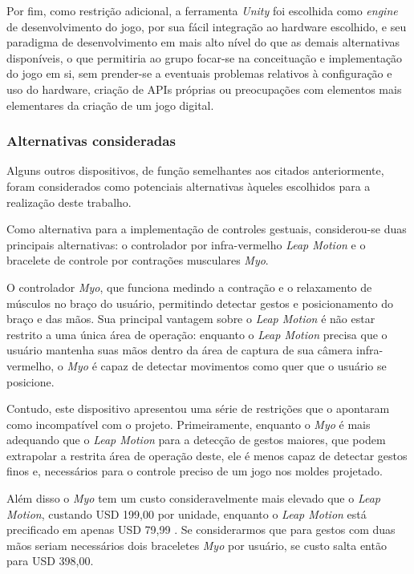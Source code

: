 Por fim, como restrição adicional, a ferramenta \textit{Unity} foi escolhida 
como \textit{engine} de desenvolvimento do jogo, por sua fácil integração 
ao hardware escolhido, e seu paradigma de desenvolvimento em mais alto nível do 
que as demais alternativas disponíveis, o que permitiria ao grupo focar-se 
na conceituação e implementação do jogo em si, sem prender-se a eventuais 
problemas relativos à configuração e uso do hardware, criação de APIs próprias 
ou preocupações com elementos mais elementares da criação de um jogo digital.

\subsubsection{Alternativas consideradas}

Alguns outros dispositivos, de função semelhantes aos citados anteriormente, foram considerados como potenciais alternativas àqueles escolhidos para a realização deste trabalho.

Como alternativa para a implementação de controles gestuais, considerou-se duas principais alternativas: o controlador por infra-vermelho \textit{Leap Motion} e o bracelete de controle por contrações musculares \textit{Myo}. 

O controlador \textit{Myo}, que funciona medindo a contração e o relaxamento de músculos no braço do usuário, permitindo detectar gestos e posicionamento do braço e das mãos. Sua principal vantagem sobre o \textit{Leap Motion} é não estar restrito a uma única área de operação: enquanto o \textit{Leap Motion} precisa que o usuário mantenha suas mãos dentro da área de captura de sua câmera infra-vermelho, o \textit{Myo} é capaz de detectar movimentos como quer que o usuário se posicione. 

Contudo, este dispositivo apresentou uma série de restrições que o apontaram como incompatível com o projeto. Primeiramente, enquanto o \textit{Myo} é mais adequando que o \textit{Leap Motion} para a detecção de gestos maiores, que podem extrapolar a restrita área de operação deste, ele é menos capaz de detectar gestos finos e, necessários para o controle preciso de um jogo nos moldes projetado. 

Além disso o \textit{Myo} tem um custo consideravelmente mais elevado que o \textit{Leap Motion}, custando USD 199,00 \cite{myo:2016:store} por unidade, enquanto o \textit{Leap Motion} está precificado em apenas USD 79,99  \cite{leap:2016:store}. Se considerarmos que para gestos com duas mãos seriam necessários dois braceletes \textit{Myo} por usuário, se custo salta então para USD 398,00.

